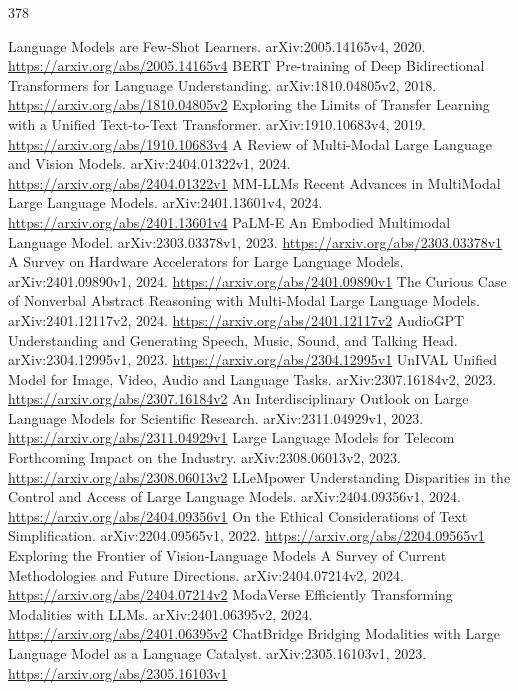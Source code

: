 \documentclass[11pt]{article}
\begin{document}
\begin{thebibliography}{378}
 Language Models are Few-Shot Learners. arXiv:2005.14165v4, 2020. \url{https://arxiv.org/abs/2005.14165v4}
 BERT Pre-training of Deep Bidirectional Transformers for Language Understanding. arXiv:1810.04805v2, 2018. \url{https://arxiv.org/abs/1810.04805v2}
 Exploring the Limits of Transfer Learning with a Unified Text-to-Text Transformer. arXiv:1910.10683v4, 2019. \url{https://arxiv.org/abs/1910.10683v4}
 A Review of Multi-Modal Large Language and Vision Models. arXiv:2404.01322v1, 2024. \url{https://arxiv.org/abs/2404.01322v1}
 MM-LLMs Recent Advances in MultiModal Large Language Models. arXiv:2401.13601v4, 2024. \url{https://arxiv.org/abs/2401.13601v4}
 PaLM-E An Embodied Multimodal Language Model. arXiv:2303.03378v1, 2023. \url{https://arxiv.org/abs/2303.03378v1}
 A Survey on Hardware Accelerators for Large Language Models. arXiv:2401.09890v1, 2024. \url{https://arxiv.org/abs/2401.09890v1}
 The Curious Case of Nonverbal Abstract Reasoning with Multi-Modal Large Language Models. arXiv:2401.12117v2, 2024. \url{https://arxiv.org/abs/2401.12117v2}
 AudioGPT Understanding and Generating Speech, Music, Sound, and Talking Head. arXiv:2304.12995v1, 2023. \url{https://arxiv.org/abs/2304.12995v1}
 UnIVAL Unified Model for Image, Video, Audio and Language Tasks. arXiv:2307.16184v2, 2023. \url{https://arxiv.org/abs/2307.16184v2}
 An Interdisciplinary Outlook on Large Language Models for Scientific Research. arXiv:2311.04929v1, 2023. \url{https://arxiv.org/abs/2311.04929v1}
 Large Language Models for Telecom Forthcoming Impact on the Industry. arXiv:2308.06013v2, 2023. \url{https://arxiv.org/abs/2308.06013v2}
 LLeMpower Understanding Disparities in the Control and Access of Large Language Models. arXiv:2404.09356v1, 2024. \url{https://arxiv.org/abs/2404.09356v1}
 On the Ethical Considerations of Text Simplification. arXiv:2204.09565v1, 2022. \url{https://arxiv.org/abs/2204.09565v1}
 Exploring the Frontier of Vision-Language Models A Survey of Current Methodologies and Future Directions. arXiv:2404.07214v2, 2024. \url{https://arxiv.org/abs/2404.07214v2}
 ModaVerse Efficiently Transforming Modalities with LLMs. arXiv:2401.06395v2, 2024. \url{https://arxiv.org/abs/2401.06395v2}
 ChatBridge Bridging Modalities with Large Language Model as a Language Catalyst. arXiv:2305.16103v1, 2023. \url{https://arxiv.org/abs/2305.16103v1}

\end{thebibliography}
\end{document}

